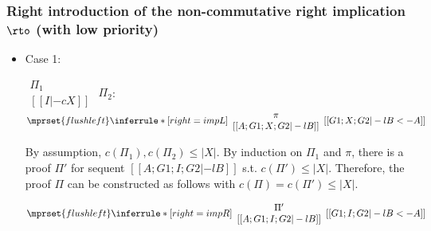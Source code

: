 \subsubsection{Right introduction of the non-commutative right implication $\rto$ (with low priority)}
\begin{itemize}
\item Case 1:
      \begin{center}
        \scriptsize
        \begin{math}
          \begin{array}{c}
            \Pi_1 \\
            {[[I |-c X]]}
          \end{array}
        \end{math}
        \qquad\qquad
        $\Pi_2$:
        \begin{math}
          $$\mprset{flushleft}
          \inferrule* [right={\tiny impL}] {
            {
              \begin{array}{c}
                \pi \\
                {[[A; G1; X; G2|-l B]]}
              \end{array}
            }
          }{[[G1; X; G2 |-l B <- A]]}
        \end{math}
      \end{center}
      By assumption, $c(\Pi_1),c(\Pi_2)\leq |X|$. By induction on $\Pi_1$
      and $\pi$, there is a proof $\Pi'$ for sequent
      $[[A; G1; I; G2 |-l B]]$ s.t. $c(\Pi') \leq |X|$. Therefore, the
      proof $\Pi$ can be constructed as follows with
      $c(\Pi) = c(\Pi') \leq |X|$.
      \begin{center}
        \scriptsize
        \begin{math}
          $$\mprset{flushleft}
          \inferrule* [right={\tiny impR}] {
            {
              \begin{array}{c}
                \Pi' \\
                {[[A; G1; I; G2 |-l B]]}
              \end{array}
            }
          }{[[G1; I; G2 |-l B <- A]]}
        \end{math}
      \end{center}


\end{itemize}
